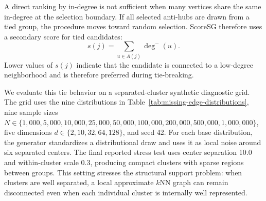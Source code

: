\documentclass[11pt]{article}
\begin{document}
A direct ranking by in-degree is not sufficient when many vertices share the same in-degree at the selection boundary. If all selected anti-hubs are drawn from a tied group, the procedure moves toward random selection. ScoreSG therefore uses a secondary score for tied candidates:
\begin{equation}
  s(j)=\sum_{u\in A(j)} \deg^{-}(u).
\end{equation}
Lower values of \(s(j)\) indicate that the candidate is connected to a low-degree neighborhood and is therefore preferred during tie-breaking.

We evaluate this tie behavior on a separated-cluster synthetic diagnostic grid. The grid uses the nine distributions in Table~\ref{tab:missing-edge-distributions}, nine sample sizes \(N\in\{1{,}000,5{,}000,10{,}000,25{,}000,50{,}000,100{,}000,200{,}000,500{,}000,1{,}000{,}000\}\), five dimensions \(d\in\{2,10,32,64,128\}\), and seed 42. For each base distribution, the generator standardizes a distributional draw and uses it as local noise around six separated centers. The final reported stress test uses center separation 10.0 and within-cluster scale 0.3, producing compact clusters with sparse regions between groups. This setting stresses the structural support problem: when clusters are well separated, a local approximate \(k\)NN graph can remain disconnected even when each individual cluster is internally well represented.

\begin{table}[H]
\centering
\caption{Synthetic distributions used in the missing-edge and connectivity diagnostics. Parameters are the values used by the experiment script.}
\label{tab:missing-edge-distributions}
\end{table}
\end{document}
